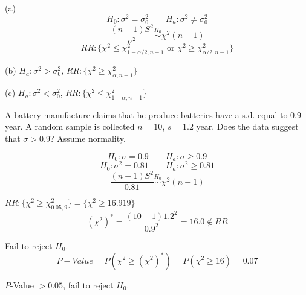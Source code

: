 (a)\[H_0:\sigma^2=\sigma_0^2 \qquad H_a:\sigma^2 \neq\sigma_0^2\]
\[\frac{(n-1)S^2}{\sigma^2} \overset{H_0}{\sim} \chi^2(n-1)\]
\[RR:\{\chi^2 \leq \chi^2_{1-\alpha/2,n-1} \text{ or } \chi^2 \geq \chi^2_{\alpha/2,n-1}\}\]

(b) $H_a:\sigma^2 >\sigma_0^2$, $RR:\{\chi^2 \geq \chi^2_{\alpha,n-1}\}$

(c) $H_a:\sigma^2 <\sigma_0^2$, $RR:\{\chi^2 \leq \chi^2_{1-\alpha,n-1}\}$

\begin{exmp}
A battery manufacture claims that he produce batteries have a s.d. equal to 0.9 year. A random sample is collected $n=10$, $s=1.2$ year. Does the data suggest that $\sigma>0.9$? Assume normality.

\[H_0:\sigma=0.9 \qquad H_a:\sigma \geq 0.9\]
\[H_0:\sigma^2=0.81 \qquad H_a:\sigma^2 \geq 0.81\]
\[\frac{(n-1)S^2}{0.81} \overset{H_0}{\sim} \chi^2(n-1)\]

$RR:\{\chi^2 \geq \chi^2_{0.05,9}\}=\{\chi^2 \geq 16.919\}$
\[(\chi^2)^*=\frac{(10-1)1.2^2}{0.9^2}=16.0 \notin RR \]

Fail to reject $H_0$.
\[P-Value=P(\chi^2\geq (\chi^2)^* )=P(\chi^2\geq  16)=0.07\]

$P$-Value $>0.05$, fail to reject $H_0$.
\end{exmp}